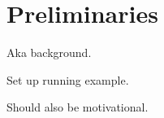 \section{Preliminaries}
\label{sec:prelim}
Aka background.

Set up running example.

Should also be motivational.
